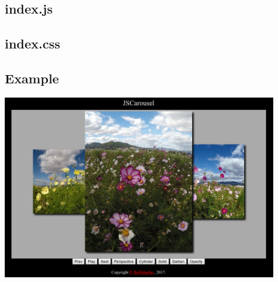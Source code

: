 \documentclass[12pt, a4paper]{article}
\begin{document}
\subsection{index.js}

\begin{scriptsize}
\begin{ttfamily}

\end{ttfamily}
\end{scriptsize}

\subsection{index.css}

\begin{scriptsize}
\begin{ttfamily}

\end{ttfamily}
\end{scriptsize}

\subsection{Example}

\begin{center}
\includegraphics[width=12cm]{jscaroussel.jpg}
\end{center} 
\end{document}
